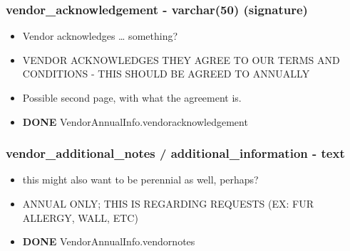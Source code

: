 \documentclass[captions=tablesignature]{scrartcl}
\begin{document}
\subsubsection{vendor\_acknowledgement - varchar(50) (signature)}
\label{sec-2-2-9}
\begin{itemize}
\item Vendor acknowledges \ldots{} something?
\item VENDOR ACKNOWLEDGES THEY AGREE TO OUR TERMS AND CONDITIONS -
THIS SHOULD BE AGREED TO ANNUALLY
\item Possible second page, with what the agreement is.
\end{itemize}
\begin{itemize}
\item {\bfseries\sffamily DONE} VendorAnnualInfo.vendoracknowledgement
\label{sec-2-2-9-1}
\end{itemize}

\subsubsection{vendor\_additional\_notes / additional\_information - text}
\label{sec-2-2-10}
\begin{itemize}
\item this might also want to be perennial as well, perhaps?
\item ANNUAL ONLY; THIS IS REGARDING REQUESTS (EX:  FUR ALLERGY, WALL,
ETC)
\end{itemize}
\begin{itemize}
\item {\bfseries\sffamily DONE} VendorAnnualInfo.vendornotes
\label{sec-2-2-10-1}
\end{itemize}
\end{document}
